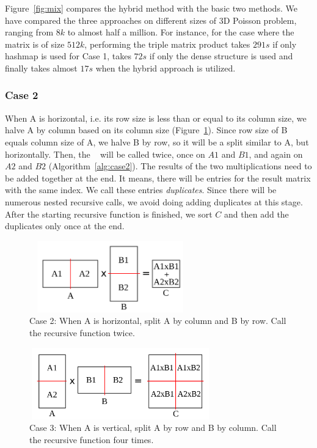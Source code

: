 Figure~\ref{fig:mix} compares the hybrid method with the basic two methods. We have compared the three approaches on different sizes of 3D Poisson problem, ranging from $8k$ to almost half a million. For instance, for the case where the matrix is of size $512k$, performing the triple matrix product takes $291s$ if only hashmap is used for Case 1, takes $72s$ if only the dense structure is used and finally takes almost $17s$ when the hybrid approach is utilized.


\subsubsection{Case 2}
\label{sec:case2}
When A is horizontal, i.e. its row size is less than or equal to its column size, we halve A by column based on its column size (Figure~\ref{fig:case2_left}). Since row size of B equals column size of A, we halve B by row, so it will be a split similar to A, but horizontally.
Then, the \recmm~ will be called twice, once on $A1$ and $B1$, and again on $A2$ and $B2$ (Algorithm~\ref{alg:case2}). The results of the two multiplications need to be added together at the end. It means, there will be entries for the result matrix with the same index. We call these entries \textit{duplicates}. Since there will be numerous nested recursive calls, we avoid doing adding duplicates at this stage. After the starting recursive function is finished, we sort $C$ and then add the duplicates only once at the end.

\begin{figure}[tbh]
    \centering
    \includegraphics[width=7cm,height=3.1cm]{./figures/case2_001.pdf}
    \caption{Case 2: When A is horizontal, split A by column and B by row. Call the recursive function twice.}
    \label{fig:case2_left}
\end{figure}

\begin{figure}[tbh]
    \centering
    \includegraphics[width=7.9cm,height=3.1cm]{./figures/case3_001.pdf}
    \caption{Case 3: When A is vertical, split A by row and B by column. Call the recursive function four times.}
    \label{fig:case3}
\end{figure}


